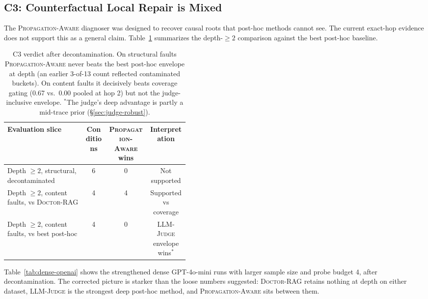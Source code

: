 \documentclass[11pt]{article}
\newcommand{\dr}{\textnormal{\textsc{Doctor-RAG}}}
\newcommand{\pa}{\textnormal{\textsc{Propagation-Aware}}}
\newcommand{\lj}{\textnormal{\textsc{LLM-Judge}}}
\begin{document}
\subsection{C3: Counterfactual Local Repair is Mixed}

The \pa{} diagnoser was designed to recover causal roots that post-hoc methods
cannot see.  The current exact-hop evidence does not support this as a general
claim.  Table~\ref{tab:c3-verdict} summarizes the depth-$\geq 2$ comparison
against the best post-hoc baseline.

\begin{table}[t]
\centering
\small
\begin{tabular}{p{0.43\linewidth}ccc}
\toprule
Evaluation slice & Conditions & \pa{} wins & Interpretation \\
\midrule
Depth $\geq 2$, structural, decontaminated & 6 & 0 & Not supported \\
Depth $\geq 2$, content faults, vs \dr{} & 4 & 4 & Supported vs coverage \\
Depth $\geq 2$, content faults, vs best post-hoc & 4 & 0 & \lj{} envelope wins$^\ast$ \\
\bottomrule
\end{tabular}
\caption{C3 verdict after decontamination.  On structural faults \pa{} never
beats the best post-hoc envelope at depth (an earlier 3-of-13 count reflected
contaminated buckets).  On content faults it decisively beats coverage gating
(0.67 vs.\ 0.00 pooled at hop 2) but not the judge-inclusive envelope.
$^\ast$The judge's deep advantage is partly a mid-trace prior
(\S\ref{sec:judge-robust}).}
\label{tab:c3-verdict}
\end{table}

Table~\ref{tab:dense-openai} shows the strengthened dense GPT-4o-mini runs with
larger sample size and probe budget 4, after decontamination.  The corrected
picture is starker than the loose numbers suggested: \dr{} retains nothing at
depth on either dataset, \lj{} is the strongest deep post-hoc method, and \pa{}
sits between them.
\end{document}
